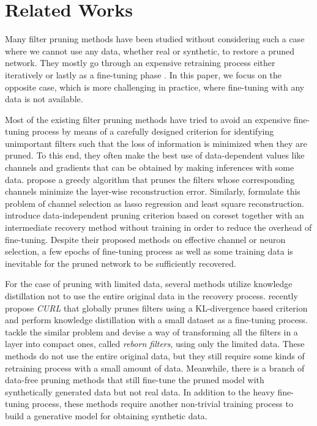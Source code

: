 \section{Related Works} \label{sec:related}
Many filter pruning methods have been studied without considering such a case where we cannot use any data, whether real or synthetic, to restore a pruned network. They mostly go through an expensive retraining process either iteratively \cite{Soft,FPGM,Dynamic} or lastly as a fine-tuning phase \cite{GlobalRanking,Importance,NISP}. In this paper, we focus on the opposite case, which is more challenging in practice, where fine-tuning with any data is not available.

Most of the existing filter pruning methods have tried to avoid an expensive fine-tuning process by means of a carefully designed criterion for identifying unimportant filters such that the loss of information is minimized when they are pruned. To this end, they often make the best use of data-dependent values like channels and gradients that can be obtained by making inferences with some data. \citet{Thinet} propose a greedy algorithm that prunes the filters whose corresponding channels minimize the layer-wise reconstruction error. Similarly, \citet{Lasso} formulate this problem of channel selection as lasso regression and least square reconstruction. \citet{CoreSet_ICLR} introduce data-independent pruning criterion based on coreset together with an intermediate recovery method without training in order to reduce the overhead of fine-tuning. Despite their proposed methods on effective channel or neuron selection, a few epochs of fine-tuning process as well as some training data is inevitable for the pruned network to be sufficiently recovered. 


For the case of pruning with limited data, several methods \cite{CURL,Reborn} utilize knowledge distillation \cite{Knowledge_Distilation} not to use the entire original data in the recovery process. \citet{CURL} recently propose \textit{CURL} that globally prunes filters using a KL-divergence based criterion and perform knowledge distillation with a small dataset as a fine-tuning process. \citet{Reborn} tackle the similar problem and devise a way of transforming all the filters in a layer into compact ones, called \textit{reborn filters}, using only the limited data. These methods do not use the entire original data, but they still require some kinds of retraining process with a small amount of data. Meanwhile, there is a branch of data-free pruning methods \cite{Data-Free-NetworkPruning, DeepInversion} that still fine-tune the pruned model with synthetically generated data but not real data. In addition to the heavy fine-tuning process, these methods require another non-trivial training process to build a generative model for obtaining synthetic data.

